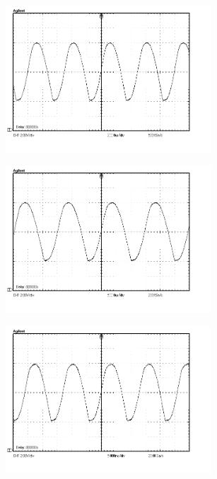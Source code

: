 \documentclass[10pt, a4j, dvipdfmx]{jarticle}
\makeatletter
\newcommand{\figcaption}[1]{\def\@captype{figure}\caption{#1}}
\makeatother
\begin{document}
      \begin{figure}[H]
        \centering
        \includegraphics[height=55mm]{223.bmp}
        \figcaption{}
        \label{fig:ex-5}
      \end{figure}
      \begin{figure}[H]
        \centering
        \includegraphics[height=55mm]{683.bmp}
        \figcaption{}
        \label{fig:ex-6}
      \end{figure}
      \begin{figure}[H]
        \centering
        \includegraphics[height=55mm]{684.bmp}
        \figcaption{}
        \label{fig:ex-7}
      \end{figure}
\end{document}
